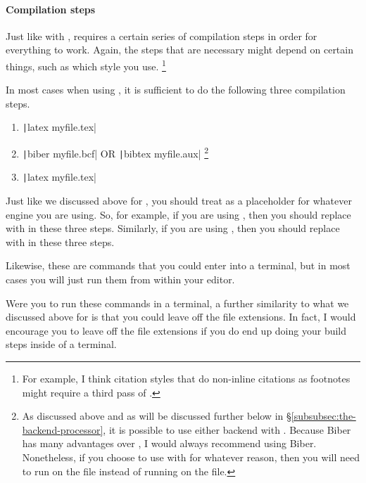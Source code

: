\paragraph{Compilation steps}

Just like with ,  requires a certain series of compilation steps in order for everything to work.
Again, the steps that are necessary might depend on certain things, such as which style you use.%
\footnote{%
For example, I think citation styles that do non-inline citations as footnotes might require a third pass of .%
}

In most cases when using , it is sufficient to do the following three compilation steps.

\begin{enumerate}[label={(\roman*)}]

	\item{\texttt|latex myfile.tex|}

	\item{\texttt|biber myfile.bcf| OR \texttt|bibtex myfile.aux|%
	\footnote{%
	\label{fn:backends-with-biblatex}
	As discussed above and as will be discussed further below in \S\ref{subsubsec:the-backend-processor}, it is possible to use either backend with .
	Because Biber has many advantages over , I would always recommend using Biber.
	Nonetheless, if you choose to use  with  for whatever reason, then you will need to run  on the  file instead of running  on the  file.%
	}
	}

	\item{\texttt|latex myfile.tex|}

\end{enumerate}

Just like we discussed above for , you should treat  as a placeholder for whatever engine you are using.
So, for example, if you are using , then you should replace  with  in these three steps.
Similarly, if you are using , then you should replace  with  in these three steps.

Likewise, these are commands that you could enter into a terminal, but in most cases you will just run them from within your editor.

Were you to run these commands in a terminal, a further similarity to what we discussed above for  is that you could leave off the file extensions.
In fact, I would encourage you to leave off the file extensions if you do end up doing your build steps inside of a terminal.

